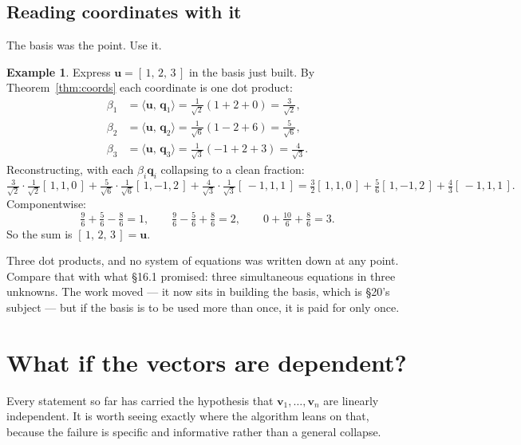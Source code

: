 \documentclass[11pt]{article}
\theoremstyle{plain}
\theoremstyle{definition}
\newtheorem{ex}{Example}[section]
\theoremstyle{remark}
\newcommand{\vc}[1]{\mathbf{#1}}
\newcommand{\ip}[2]{\langle #1,\, #2\rangle}
\begin{document}
\subsection{Reading coordinates with it}
The basis was the point. Use it.

\begin{ex}
Express $\vc{u}=[\,1,\,2,\,3\,]$ in the basis just built. By
Theorem~\ref{thm:coords} each coordinate is one dot product:
\[
  \begin{aligned}
    \beta_{1}&=\ip{\vc{u}}{\vc{q}_{1}}
              =\tfrac{1}{\sqrt2}(1+2+0)=\tfrac{3}{\sqrt2}, \\
    \beta_{2}&=\ip{\vc{u}}{\vc{q}_{2}}
              =\tfrac{1}{\sqrt6}(1-2+6)=\tfrac{5}{\sqrt6}, \\
    \beta_{3}&=\ip{\vc{u}}{\vc{q}_{3}}
              =\tfrac{1}{\sqrt3}(-1+2+3)=\tfrac{4}{\sqrt3}.
  \end{aligned}
\]
Reconstructing, with each $\beta_{i}\vc{q}_{i}$ collapsing to a clean fraction:
\[
  \tfrac{3}{\sqrt2}\cdot\tfrac{1}{\sqrt2}[\,1,1,0\,]
  +\tfrac{5}{\sqrt6}\cdot\tfrac{1}{\sqrt6}[\,1,-1,2\,]
  +\tfrac{4}{\sqrt3}\cdot\tfrac{1}{\sqrt3}[\,-1,1,1\,]
  =\tfrac32[\,1,1,0\,]+\tfrac56[\,1,-1,2\,]+\tfrac43[\,-1,1,1\,] .
\]
Componentwise:
\[
  \tfrac96+\tfrac56-\tfrac86=1,
  \qquad
  \tfrac96-\tfrac56+\tfrac86=2,
  \qquad
  0+\tfrac{10}{6}+\tfrac86=3 .
\]
So the sum is $[\,1,\,2,\,3\,]=\vc{u}$. \checkmark
\end{ex}

\noindent Three dot products, and no system of equations was written down at any
point. Compare that with what \S16.1 promised: three simultaneous equations in
three unknowns. The work moved --- it now sits in building the basis, which is
\S20's subject --- but if the basis is to be used more than once, it is paid for
only once.

\section{What if the vectors are dependent?}
Every statement so far has carried the hypothesis that
$\vc{v}_{1},\dots,\vc{v}_{n}$ are linearly independent. It is worth seeing
exactly where the algorithm leans on that, because the failure is specific and
informative rather than a general collapse.
\end{document}

